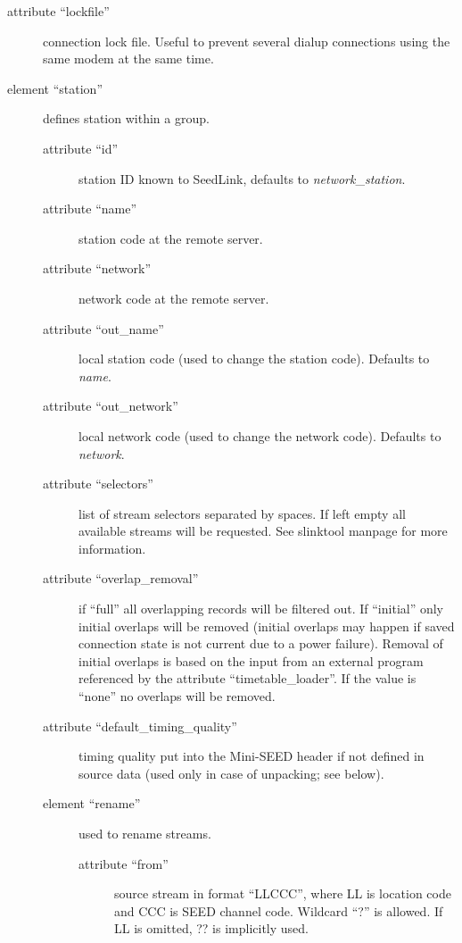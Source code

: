 \documentclass[11pt,a4paper,titlepage]{article}
\begin{document}
\begin{description}
\begin{description}
\begin{description}
\item[attribute ``lockfile''] connection lock file. Useful to prevent
several dialup connections using the same modem at the same time.

\item[element ``station''] defines station within a group.

\begin{description}
\item[attribute ``id''] station ID known to SeedLink, defaults to
\textit{network}\_\textit{station}.

\item[attribute ``name''] station code at the remote server.

\item[attribute ``network''] network code at the remote server.

\item[attribute ``out\_name''] local station code (used to change the
station code). Defaults to \textit{name}.

\item[attribute ``out\_network''] local network code (used to change the
network code). Defaults to \textit{network}.

\item[attribute ``selectors''] list of stream selectors separated by
spaces. If left empty all available streams will be requested. See
slinktool manpage for more information.

\item[attribute ``overlap\_removal''] if ``full'' all overlapping records
will be filtered out. If ``initial'' only initial overlaps will be removed
(initial overlaps may happen if saved connection state is not current due
to a power failure). Removal of initial overlaps is based on the input from
an external program referenced by the attribute ``timetable\_loader''. If
the value is ``none'' no overlaps will be removed.

\item[attribute ``default\_timing\_quality''] timing quality put into the
Mini-SEED header if not defined in source data (used only in case of
unpacking; see below).

\item[element ``rename''] used to rename streams.

\begin{description}
\item[attribute ``from''] source stream in format ``LLCCC'', where LL is
location code and CCC is SEED channel code. Wildcard ``?'' is allowed. If
LL is omitted, ?? is implicitly used.


\end{description}
\end{description}
\end{description}
\end{description}
\end{description}
\end{document}
